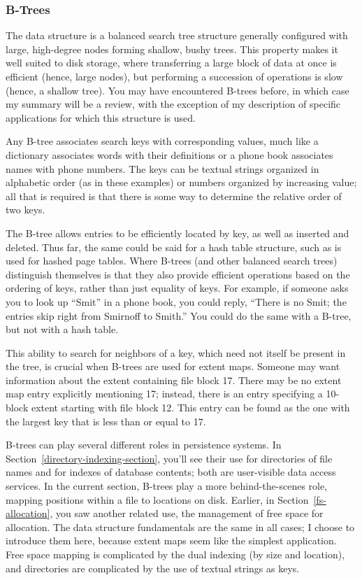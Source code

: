 \subsubsection{B-Trees}\label{B-trees}

The  data structure is a balanced search tree structure
generally configured with large, high-degree nodes forming shallow,
bushy trees.  This property makes it well suited to disk storage,
where transferring a large block of data at once is efficient (hence,
large nodes), but performing a succession of operations is slow (hence,
a shallow tree).  You may have encountered B-trees before,
in which case my summary will be a review, with the exception
of my description of specific applications for which this structure
is used.

Any B-tree associates search keys with corresponding values, much like
a dictionary associates words with their definitions or a phone book
associates names with phone numbers.  The keys can be textual strings
organized in alphabetic order (as in these examples) or numbers
organized by increasing value; all that is required is that there is
some way to determine the relative order of two keys.

The B-tree allows entries to be efficiently located by key, as well as
inserted and deleted.  Thus far, the same could be said for a hash
table structure, such as is used for hashed page tables.  Where
B-trees (and other balanced search trees) distinguish themselves is
that they also provide efficient operations based on the ordering of
keys, rather than just equality of keys.  For example, if someone asks
you to look up ``Smit'' in a phone book, you could reply, ``There is no
Smit; the entries skip right from Smirnoff to Smith.''  You could do
the same with a B-tree, but not with a hash table.

This ability to search for neighbors of a key, which need not itself
be present in the tree, is crucial when B-trees are used for extent
maps.  Someone may want information about the extent containing file
block 17.  There may be no extent map entry explicitly mentioning 17;
instead, there is an entry specifying a 10-block extent starting with
file block 12.  This entry can be found as the one with the largest key
that is less than or equal to 17.

B-trees can play several different roles in persistence systems.  In
Section~\ref{directory-indexing-section}, you'll see their use for
directories of file names and for indexes of database contents; both
are user-visible data access services.  In the current section,
B-trees play a
more behind-the-scenes role, mapping positions within a file to
locations on disk.  Earlier, in Section~\ref{fs-allocation}, you saw
another related use, the management of free space for allocation.  The
data structure fundamentals are the same in all cases; I choose to
introduce them here, because extent maps seem like the simplest
application.  Free space mapping is complicated by the dual indexing
(by size and location), and directories are complicated by the use of
textual strings as keys.

